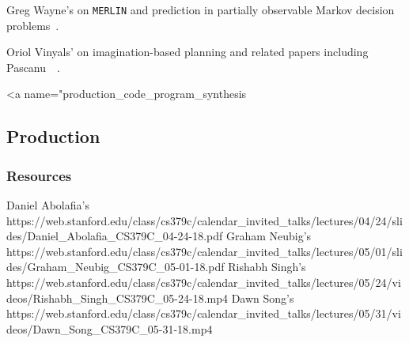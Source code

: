 Greg Wayne's {} on {\tt{MERLIN}} and prediction in partially observable Markov decision problems~\cite{WayneetalCoRR-18}.

Oriol Vinyals' {} on imagination-based planning and related papers including Pascanu~\etal{}~\cite{PascanuetalCoRR-17}.



\rawhtml
<a name="production_code_program_synthesis
\endrawhtml
\subsection*{Production}


\subsubsection*{Resources}

Daniel Abolafia's
https://web.stanford.edu/class/cs379c/calendar_invited_talks/lectures/04/24/slides/Daniel_Abolafia_CS379C_04-24-18.pdf
Graham Neubig's
https://web.stanford.edu/class/cs379c/calendar_invited_talks/lectures/05/01/slides/Graham_Neubig_CS379C_05-01-18.pdf
Rishabh Singh's
https://web.stanford.edu/class/cs379c/calendar_invited_talks/lectures/05/24/videos/Rishabh_Singh_CS379C_05-24-18.mp4
Dawn Song's
https://web.stanford.edu/class/cs379c/calendar_invited_talks/lectures/05/31/videos/Dawn_Song_CS379C_05-31-18.mp4



